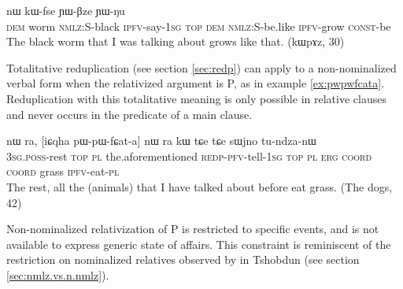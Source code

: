 \documentclass[oldfontcommands,oneside,a4paper,11pt]{article}
\newcommand{\ipa}[1]{{\phon #1}} %
\begin{document}
     \begin{exe}
   \ex \label{ex:tutianw}
 \gll [\ipa{nɯ}  	\textbf{\ipa{qajɯ}}  	\ipa{kɯ-ɲaʁ}  	\ipa{tu-ti-a}]  	\ipa{nɯ}  	\ipa{nɯ}  	\ipa{kɯ-fse}  	\ipa{ɲɯ-βze}  	\ipa{ɲɯ-ŋu}  \\
\textsc{dem} worm \textsc{nmlz:S}-black \textsc{ipfv}-say-\textsc{1sg} \textsc{top} \textsc{dem} \textsc{nmlz:S}-be.like \textsc{ipfv}-grow \textsc{const}-be \\
\glt The black worm that I was talking about grows like that. (kɯpɤz, 30)
\end{exe}





Totalitative reduplication  (see section \ref{sec:redp}) can apply to a non-nominalized verbal form when the relativized argument is P, as in example \ref{ex:pwpwfcata}. Reduplication with this totalitative meaning is only possible in relative clauses and never occurs in the predicate of a main clause.

     \begin{exe}
   \ex \label{ex:pwpwfcata}
 \gll \ipa{ɯ-ro}   	\ipa{nɯ} \ipa{ra,}   	[\ipa{iɕqha}   	\ipa{pɯ-pɯ-fɕat-a}]   	\ipa{nɯ} \ipa{ra}  	\ipa{kɯ}   	\ipa{tɕe}   	\ipa{tɕe}   	\ipa{sɯjno}   	\ipa{tu-ndza-nɯ}    \\
 \textsc{3sg.poss}-rest \textsc{top} \textsc{pl} the.aforementioned \textsc{redp-pfv}-tell-\textsc{1sg} \textsc{top} \textsc{pl} \textsc{erg} \textsc{coord} \textsc{coord} grass \textsc{ipfv}-eat-\textsc{pl} \\
\glt The rest, all the (animals) that I have talked about before eat grass. (The dogs, 42)
\end{exe}

Non-nominalized relativization of P is restricted to specific events, and is not available to express generic state of affairs. This constraint is reminiscent of the restriction on nominalized relatives observed by \citet[10]{jacksonlin07} in Tshobdun (see section \ref{sec:nmlz.vs.n.nmlz}).

  




\end{document}
